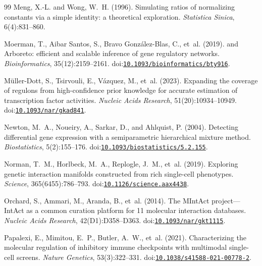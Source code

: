 \documentclass[11pt,a4paper]{article}
\begin{document}
\begin{thebibliography}{99}
Meng, X.-L. and Wong, W.~H. (1996).
\newblock Simulating ratios of normalizing constants via a simple identity: a theoretical exploration.
\newblock \emph{Statistica Sinica}, 6(4):831--860.

Moerman, T., Aibar Santos, S., Bravo Gonz{\'a}lez-Blas, C., et~al. (2019).
 and {Arboreto}: efficient and scalable inference of gene regulatory networks.
\newblock \emph{Bioinformatics}, 35(12):2159--2161.
\newblock doi:\href{https://doi.org/10.1093/bioinformatics/bty916}{\nolinkurl{10.1093/bioinformatics/bty916}}.

M{\"u}ller-Dott, S., Tsirvouli, E., V{\'a}zquez, M., et~al. (2023).
\newblock Expanding the coverage of regulons from high-confidence prior knowledge for accurate estimation of transcription factor activities.
\newblock \emph{Nucleic Acids Research}, 51(20):10934--10949.
\newblock doi:\href{https://doi.org/10.1093/nar/gkad841}{\nolinkurl{10.1093/nar/gkad841}}.

Newton, M.~A., Noueiry, A., Sarkar, D., and Ahlquist, P. (2004).
\newblock Detecting differential gene expression with a semiparametric hierarchical mixture method.
\newblock \emph{Biostatistics}, 5(2):155--176.
\newblock doi:\href{https://doi.org/10.1093/biostatistics/5.2.155}{\nolinkurl{10.1093/biostatistics/5.2.155}}.

Norman, T.~M., Horlbeck, M.~A., Replogle, J.~M., et~al. (2019).
\newblock Exploring genetic interaction manifolds constructed from rich single-cell phenotypes.
\newblock \emph{Science}, 365(6455):786--793.
\newblock doi:\href{https://doi.org/10.1126/science.aax4438}{\nolinkurl{10.1126/science.aax4438}}.

Orchard, S., Ammari, M., Aranda, B., et~al. (2014).
\newblock The MIntAct project---IntAct as a common curation platform for 11 molecular interaction databases.
\newblock \emph{Nucleic Acids Research}, 42(D1):D358--D363.
\newblock doi:\href{https://doi.org/10.1093/nar/gkt1115}{\nolinkurl{10.1093/nar/gkt1115}}.

Papalexi, E., Mimitou, E.~P., Butler, A.~W., et~al. (2021).
\newblock Characterizing the molecular regulation of inhibitory immune checkpoints with multimodal single-cell screens.
\newblock \emph{Nature Genetics}, 53(3):322--331.
\newblock doi:\href{https://doi.org/10.1038/s41588-021-00778-2}{\nolinkurl{10.1038/s41588-021-00778-2}}.


\end{thebibliography}
\end{document}
